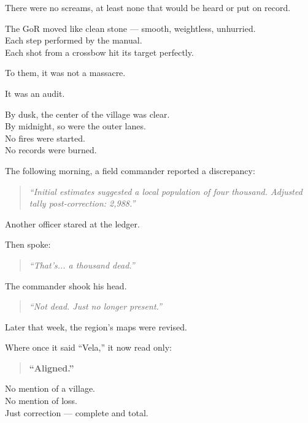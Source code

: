 \documentclass[12pt]{article}
\begin{document}
\vspace{1em}

There were no screams, at least none that would be heard or put on record.

The GoR moved like clean stone — smooth, weightless, unhurried.\\
Each step performed by the manual.\\
Each shot from a crossbow hit its target perfectly.

To them, it was not a massacre.

It was an audit.

\vspace{1em}

By dusk, the center of the village was clear.\\
By midnight, so were the outer lanes.\\
No fires were started.\\
No records were burned.

\vspace{1em}

The following morning, a field commander reported a discrepancy:

\begin{quote}
\textit{“Initial estimates suggested a local population of four thousand. Adjusted tally post-correction: 2,988.”}
\end{quote}

Another officer stared at the ledger.

Then spoke:

\begin{quote}
\textit{“That’s... a thousand dead.”}
\end{quote}

The commander shook his head.

\begin{quote}
\textit{“Not dead. Just no longer present.”}
\end{quote}

\vspace{1em}

Later that week, the region’s maps were revised.

Where once it said “Vela,” it now read only:

\begin{quote}
\textbf{“Aligned.”}
\end{quote}

No mention of a village.\\
No mention of loss.\\
Just correction — complete and total.
\end{document}
